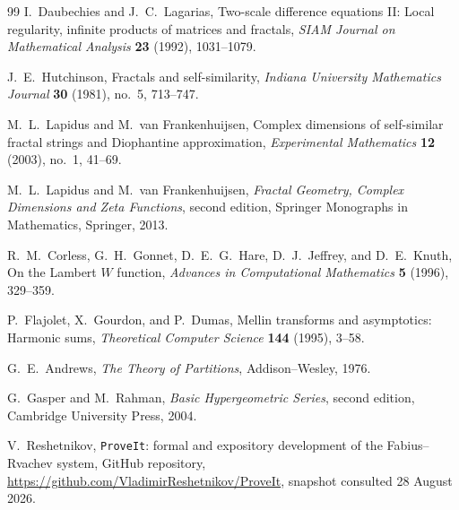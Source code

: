 \documentclass[11pt,oneside]{article}
\theoremstyle{definition}
\theoremstyle{remark}
\begin{document}
\begin{thebibliography}{99}
I.~Daubechies and J.~C.~Lagarias,
\newblock Two-scale difference equations II: Local regularity, infinite products of matrices and fractals,
\newblock \emph{SIAM Journal on Mathematical Analysis} \textbf{23} (1992), 1031--1079.

J.~E.~Hutchinson,
\newblock Fractals and self-similarity,
\newblock \emph{Indiana University Mathematics Journal} \textbf{30} (1981), no.~5, 713--747.

M.~L.~Lapidus and M.~van Frankenhuijsen,
\newblock Complex dimensions of self-similar fractal strings and Diophantine approximation,
\newblock \emph{Experimental Mathematics} \textbf{12} (2003), no.~1, 41--69.

M.~L.~Lapidus and M.~van Frankenhuijsen,
\newblock \emph{Fractal Geometry, Complex Dimensions and Zeta Functions}, second edition,
\newblock Springer Monographs in Mathematics, Springer, 2013.

R.~M.~Corless, G.~H.~Gonnet, D.~E.~G.~Hare, D.~J.~Jeffrey, and D.~E.~Knuth,
\newblock On the Lambert $W$ function,
\newblock \emph{Advances in Computational Mathematics} \textbf{5} (1996), 329--359.

P.~Flajolet, X.~Gourdon, and P.~Dumas,
\newblock Mellin transforms and asymptotics: Harmonic sums,
\newblock \emph{Theoretical Computer Science} \textbf{144} (1995), 3--58.

G.~E.~Andrews,
\newblock \emph{The Theory of Partitions},
\newblock Addison--Wesley, 1976.

G.~Gasper and M.~Rahman,
\newblock \emph{Basic Hypergeometric Series}, second edition,
\newblock Cambridge University Press, 2004.

V.~Reshetnikov,
\newblock \texttt{ProveIt}: formal and expository development of the Fabius--Rvachev system,
\newblock GitHub repository, \url{https://github.com/VladimirReshetnikov/ProveIt}, snapshot consulted 28 August 2026.

\end{thebibliography}
\end{document}
